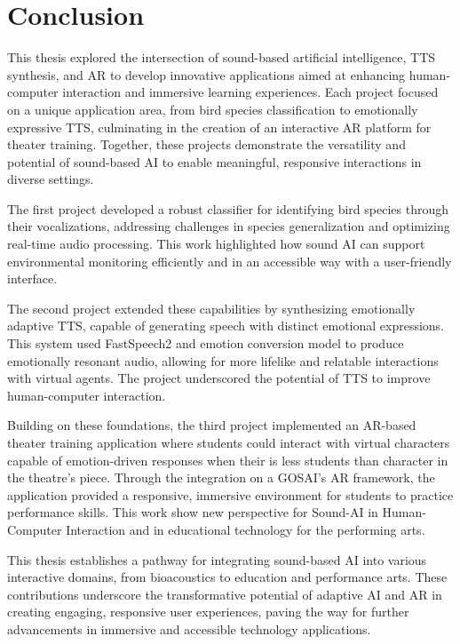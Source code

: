 \section{Conclusion}
This thesis explored the intersection of sound-based artificial intelligence, TTS synthesis, and AR to develop innovative applications aimed at enhancing human-computer interaction and immersive learning experiences. Each project focused on a unique application area, from bird species classification to emotionally expressive TTS, culminating in the creation of an interactive AR platform for theater training. Together, these projects demonstrate the versatility and potential of sound-based AI to enable meaningful, responsive interactions in diverse settings.

The first project developed a robust classifier for identifying bird species through their vocalizations, addressing challenges in species generalization and optimizing real-time audio processing. This work highlighted how sound AI  can support environmental monitoring efficiently and in an accessible way with a user-friendly interface.

The second project extended these capabilities by synthesizing emotionally adaptive TTS, capable of generating speech with distinct emotional expressions. This system used FastSpeech2 and emotion conversion model to produce emotionally resonant audio, allowing for more lifelike and relatable interactions with virtual agents. The project underscored the potential of TTS to improve human-computer interaction.

Building on these foundations, the third project implemented an AR-based theater training application where students could interact with virtual characters capable of emotion-driven responses when their is less students than character in the theatre's piece. Through the integration on a GOSAI’s AR framework, the application provided a responsive, immersive environment for students to practice performance skills. This work show new perspective for Sound-AI in Human-Computer Interaction and in educational technology for the performing arts.

This thesis establishes a pathway for integrating sound-based AI into various interactive domains, from bioacoustics to education and performance arts. These contributions underscore the transformative potential of adaptive AI and AR in creating engaging, responsive user experiences, paving the way for further advancements in immersive and accessible technology applications.